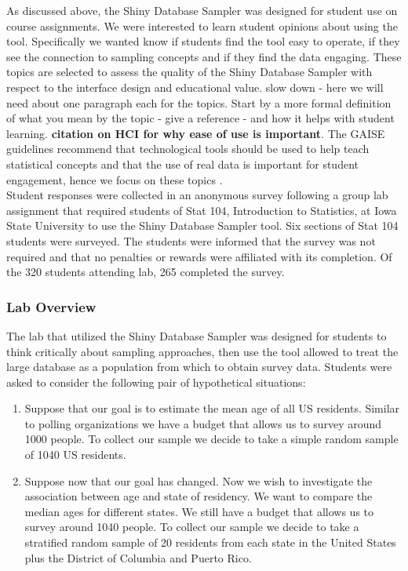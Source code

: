 \documentclass{article}\usepackage[]{graphicx}\usepackage[]{color}
\newcommand{\hh}[1]{{\color{ForestGreen} #1}}
\newcommand{\km}[1]{{\color{Orange} #1}}
\begin{document}
As discussed above, the Shiny Database Sampler was designed for student use on course assignments. We were interested to learn student opinions about using the tool. Specifically we wanted know if students find the tool easy to operate, if they see the connection to sampling concepts and if they find the data engaging. \km{These topics are selected to assess the quality of the Shiny Database Sampler with respect to the interface design and educational value.}
\hh{slow down - here we will need about one paragraph each for the topics. Start by a more formal definition of what you mean by the topic - give a reference - and how it helps with student learning. }
\km{\textbf{citation on HCI for why ease of use is important}.  The GAISE guidelines recommend that technological tools should be used to help teach statistical concepts and that the use of real data is important for student engagement, hence we focus on these topics \citep{GAISEcollege}. } \\

Student responses were collected in an anonymous survey following a group lab assignment that required students of Stat 104, Introduction to Statistics, at Iowa State University to use the Shiny Database Sampler tool. Six sections of Stat 104 students were surveyed. The students were informed that the survey was not required and that no penalties or rewards were affiliated with its completion.  Of the 320 students attending lab, 265 completed the survey. 

 \subsubsection{Lab Overview} 

The lab that utilized the Shiny Database Sampler was designed for students to think critically about sampling approaches, then use the tool allowed to treat the large database as 
a population from which to obtain survey data. Students were asked to consider the following pair of hypothetical situations:

\begin{enumerate}
\item Suppose that our goal is to estimate the mean age of all US residents. Similar to polling organizations we have a budget that allows us to survey around 1000 people. To collect our sample we decide to take a simple random sample of 1040 US residents.

\item Suppose now that our goal has changed.  Now we wish to investigate the association between age and state of residency. We want to compare the median ages for different states. We still have a budget that allows us to survey around 1040 people. To collect our sample we decide to take a stratified random sample of 20 residents from each state in the United States plus the District of Columbia and Puerto Rico. 
\end{enumerate}
\end{document}
